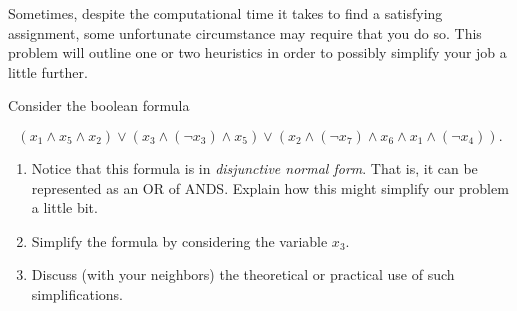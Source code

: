 Sometimes, despite the computational time it takes to find a satisfying assignment, some unfortunate circumstance may require that you do so. This problem will outline one or two heuristics in order to possibly simplify your job a little further.

Consider the boolean formula

\[(x_1 \land x_5 \land x_2) \lor (x_3 \land (\neg x_3) \land x_5) \lor (x_2 \land (\neg x_7) \land x_6 \land x_1 \land (\neg x_4)).\]

\begin{enumerate}
    \item Notice that this formula is in \textit{disjunctive normal form}. That is, it can be represented as an OR of ANDS. Explain how this might simplify our problem a little bit.
    \item Simplify the formula by considering the variable $x_3$.
    \item Discuss (with your neighbors) the theoretical or practical use of such simplifications.
\end{enumerate}